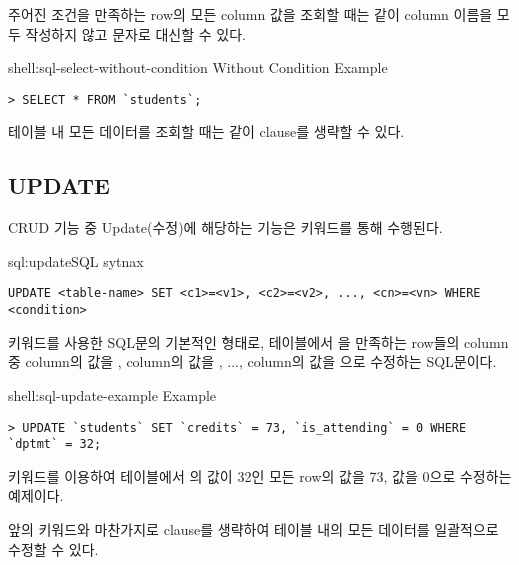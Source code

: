주어진 조건을 만족하는 row의 모든 column 값을 조회할 때는 \와 같이 column 이름을 모두 작성하지 않고 \cd{*} 문자로 대신할 수 있다.

\begin{shell}{shell:sql-select-without-condition}{ Without Condition Example}
\begin{verbatim}
> SELECT * FROM `students`;
\end{verbatim}
\end{shell}

테이블 내 모든 데이터를 조회할 때는 \과 같이  clause를 생략할 수 있다.

\subsection*{UPDATE}

CRUD 기능 중 Update(수정)에 해당하는 기능은  키워드를 통해 수행된다.

\begin{sql}{sql:update}{SQL  sytnax}
\begin{verbatim}
UPDATE <table-name> SET <c1>=<v1>, <c2>=<v2>, ..., <cn>=<vn> WHERE <condition>
\end{verbatim}
\end{sql}

\는  키워드를 사용한 SQL문의 기본적인 형태로,  테이블에서 을 만족하는 row들의 column 중  column의 값을 ,  column의 값을 , ...,  column의 값을 으로 수정하는 SQL문이다.

\begin{shell}{shell:sql-update-example}{ Example}
\begin{verbatim}
> UPDATE `students` SET `credits` = 73, `is_attending` = 0 WHERE `dptmt` = 32;
\end{verbatim}
\end{shell}

\은  키워드를 이용하여  테이블에서 의 값이 32인 모든 row의  값을 73,  값을 0으로 수정하는 예제이다.

앞의  키워드와 마찬가지로  clause를 생략하여 테이블 내의 모든 데이터를 일괄적으로 수정할 수 있다.

